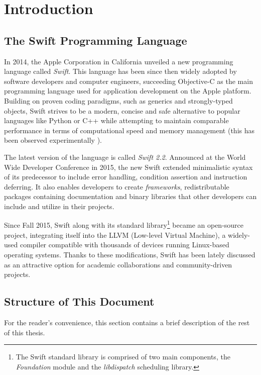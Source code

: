 \chapter{Introduction}



\section{The Swift Programming Language}
In 2014, the Apple Corporation in California unveiled a new programming language called \textit{Swift}. \cite{SwiftReference} This language has been since then widely adopted by software developers and computer engineers, succeeding Objective-C as the main programming language used for application development on the Apple platform. Building on proven coding paradigms, such as generics and strongly-typed objects, Swift strives to be a modern, concise and safe alternative to popular languages like Python or C++ while attempting to maintain comparable performance in terms of computational speed and memory management (this has been observed experimentally \cite{PrimateLabsBenchmark}).

The latest version of the language is called \textit{Swift 2.2}. Announced at the World Wide Developer Conference in 2015, the new Swift extended minimalistic syntax of its predecessor to include error handling, condition assertion and instruction deferring. It also enables developers to create \textit{frameworks}, redistributable packages containing documentation and binary libraries that other developers can include and utilize in their projects.

Since Fall 2015, Swift along with its standard library\footnote{The Swift standard library is comprised of two main components, the \textit{Foundation} module and the \textit{libdispatch} scheduling library.} became an open-source project, integrating itself into the LLVM (Low-level Virtual Machine), a widely-used compiler compatible with thousands of devices running Linux-based operating systems. Thanks to these modifications, Swift has been lately discussed as an attractive option for academic collaborations and community-driven projects.


\section{Structure of This Document}
For the reader's convenience, this section contains a brief description of the rest of this thesis.

